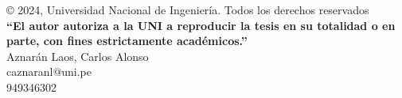\begin{permisos}
	\onehalfspacing  %

	© 2024, Universidad Nacional de Ingeniería. Todos los derechos reservados \\
	\textbf{``El autor autoriza a la UNI a reproducir la tesis en su totalidad o en parte, con fines estrictamente académicos.''} \\
	Aznarán Laos, Carlos Alonso \\
	caznaranl@uni.pe \\
	949346302

	\singlespacing  %
\end{permisos}
